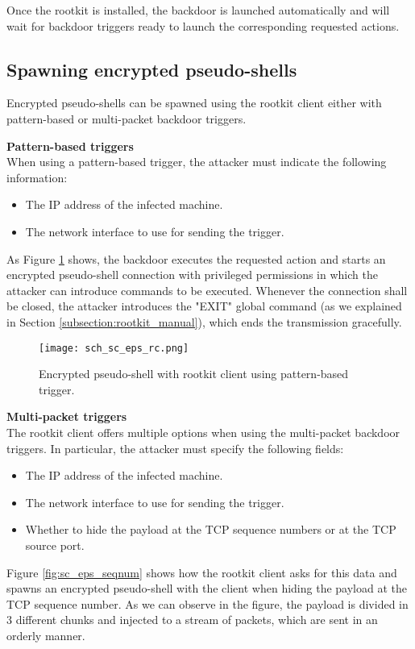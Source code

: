 Once the rootkit is installed, the backdoor is launched automatically and will wait for backdoor triggers ready to launch the corresponding requested actions.

\subsection{Spawning encrypted pseudo-shells}
Encrypted pseudo-shells can be spawned using the rootkit client either with pattern-based or multi-packet backdoor triggers.

\textbf{Pattern-based triggers}\\
When using a pattern-based trigger, the attacker must indicate the following information:
\begin{itemize}
\item The IP address of the infected machine.
\item The network interface to use for sending the trigger.
\end{itemize}

As Figure \ref{fig:sc_eps_rc} shows, the backdoor executes the requested action and starts an encrypted pseudo-shell connection with privileged permissions in which the attacker can introduce commands to be executed. Whenever the connection shall be closed, the attacker introduces the "EXIT" global command (as we explained in Section \ref{subsection:rootkit_manual}), which ends the transmission gracefully.

\begin{figure}[htbp]
	\centering
	\texttt{[image: sch\_sc\_eps\_rc.png]}
	\caption{Encrypted pseudo-shell with rootkit client using pattern-based trigger.}
	\label{fig:sc_eps_rc}
\end{figure}

\textbf{Multi-packet triggers}\\
The rootkit client offers multiple options when using the multi-packet backdoor triggers. In particular, the attacker must specify the following fields:
\begin{itemize}
\item The IP address of the infected machine.
\item The network interface to use for sending the trigger.
\item Whether to hide the payload at the TCP sequence numbers or at the TCP source port.
\end{itemize}

Figure \ref{fig:sc_eps_seqnum} shows how the rootkit client asks for this data and spawns an encrypted pseudo-shell with the client when hiding the payload at the TCP sequence number. As we can observe in the figure, the payload is divided in 3 different chunks and injected to a stream of packets, which are sent in an orderly manner.

